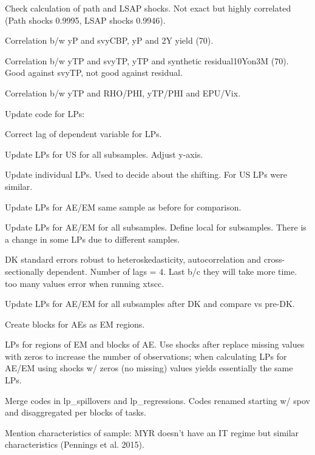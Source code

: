 \documentclass[12pt]{article}
\newcommand{\cmark}{\ding{51}}
\newcommand{\xmark}{\ding{55}}
\newcommand{\done}{\rlap{$\square$}{\raisebox{2pt}{\large\hspace{1pt}\cmark}}%
	\hspace{-2.5pt}}
\newcommand{\wontdo}{\rlap{$\square$}{\large\hspace{1pt}\xmark}}
\begin{document}
\begin{todolist}
	\begin{todolist}
		\item[\done] Check calculation of path and LSAP shocks. Not exact but highly correlated (Path shocks 0.9995, LSAP shocks 0.9946).
		\item[\done] Correlation b/w yP and svyCBP, yP and 2Y yield (70).
		\item[\done] Correlation b/w yTP and svyTP, yTP and synthetic residual10Yon3M (70). Good against svyTP, not good against residual.
		\item[\done] Correlation b/w yTP and RHO/PHI, yTP/PHI and EPU/Vix.
	\end{todolist}
	\item[\done] Update code for LPs:
	\begin{todolist}
		\item[\done] Correct lag of dependent variable for LPs.
		\item[\done] Update LPs for US for all subsamples. Adjust y-axis. 
		\item[\wontdo] Update individual LPs. Used to decide about the shifting. For US LPs were similar.
		\item[\done] Update LPs for AE/EM same sample as before for comparison.
		\item[\done] Update LPs for AE/EM for all subsamples. Define local for subsamples. There is a change in some LPs due to different samples.
		\item[\wontdo] DK standard errors robust to heteroskedasticity, autocorrelation and cross-sectionally dependent. Number of lags = 4. Last b/c they will take more time. too many values error when running xtscc.
		\item[\wontdo] Update LPs for AE/EM for all subsamples after DK and compare vs pre-DK.
		\item[\done] Create blocks for AEs as EM regions.
		\item[\done] LPs for regions of EM and blocks of AE. Use shocks after replace missing values with zeros to increase the number of observations; when calculating LPs for AE/EM using shocks w/ zeros (no missing) values yields essentially the same LPs.
		\item[\done] Merge codes in lp_spillovers and lp_regressions. Codes renamed starting w/ spov and disaggregated per blocks of tasks.
	\end{todolist}
	\item[\done] Mention characteristics of sample: MYR doesn't have an IT regime but similar characteristics (Pennings et al. 2015).

\end{todolist}
\end{document}
